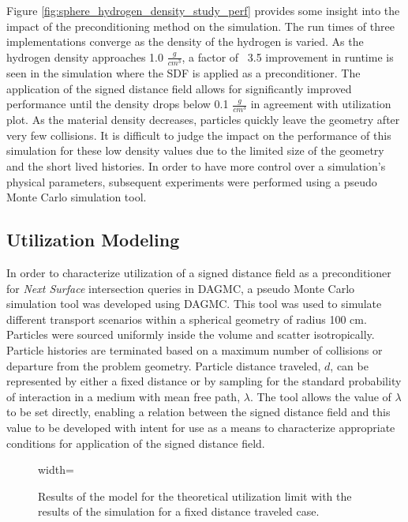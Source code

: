 Figure \ref{fig:sphere_hydrogen_density_study_perf} provides some insight into the
impact of the preconditioning method on the simulation. The run times
of three implementations  converge as the density of the
hydrogen is varied. As the hydrogen density approaches 1.0 $\frac{g}{cm^3}$, a
factor of ~3.5 improvement in runtime is seen in the simulation where the SDF is
applied as a preconditioner. The application of the signed distance field allows
for significantly improved performance until the density drops below 0.1
$\frac{g}{cm^3}$ in agreement with utilization plot. As the material density
decreases, particles quickly leave the geometry after very few collisions. It is
difficult to judge the impact on the performance of this simulation for these
low density values due to the limited size of the geometry and the short lived
histories.  In order to have more control over a simulation's physical
parameters, subsequent experiments were performed using a pseudo Monte Carlo
simulation tool.

\subsection{Utilization Modeling}

In order to characterize utilization of a signed distance field as a
preconditioner for \textit{Next Surface} intersection queries in DAGMC, a pseudo Monte
Carlo simulation tool was developed using DAGMC. This tool was used to simulate
different transport scenarios within a spherical geometry of radius 100
cm. Particles were sourced uniformly inside the volume and scatter
isotropically. Particle histories are terminated based on a maximum number of
collisions or departure from the problem geometry. Particle distance traveled,
$d$, can be represented by either a fixed distance or by sampling for the
standard probability of interaction in a medium with mean free path,
$\lambda$. The tool allows the value of $\lambda$ to be set directly, enabling a
relation between the signed distance field and this value to be developed with
intent for use as a means to characterize appropriate
conditions for application of the signed distance field.

\begin{figure}[H]
  \centering
  {width=\textwidth}
  \caption[Pseudo-simulation results for the fixed distances traveled.]{Results
    of the model for the theoretical utilization limit with the results of the
    simulation for a fixed distance traveled case.}
  \label{fig:sdf_fixed_dist}    
\end{figure}

